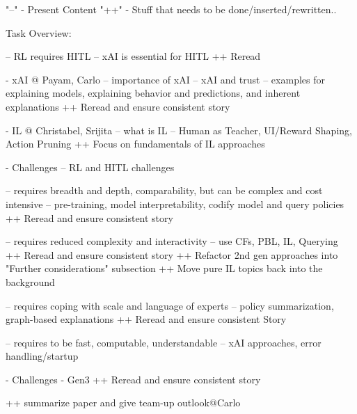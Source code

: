 "--" - Present Content
"++" - Stuff that needs to be done/inserted/rewritten..


Task Overview:

-- RL requires HITL
-- xAI is essential for HITL
++ Reread

- xAI @ Payam, Carlo
-- importance of xAI
-- xAI and trust 
-- examples for explaining models, explaining behavior and predictions, and inherent explanations
++ Reread and ensure consistent story

- IL @ Christabel, Srijita
-- what is IL
-- Human as Teacher, UI/Reward Shaping, Action Pruning
++ Focus on fundamentals of IL approaches

- Challenges
-- RL and HITL challenges


-- requires breadth and depth, comparability, but can be complex and cost intensive
-- pre-training, model interpretability, codify model and query policies
++ Reread and ensure consistent story

-- requires reduced complexity and interactivity
-- use CFs, PBL, IL, Querying
++ Reread and ensure consistent story
++ Refactor 2nd gen approaches into "Further considerations" subsection
++ Move pure IL topics back into the background

-- requires coping with scale and language of experts
-- policy summarization, graph-based explanations
++ Reread and ensure consistent Story

-- requires to be fast, computable, understandable
-- xAI approaches, error handling/startup

- Challenges
- Gen3
++ Reread and ensure consistent story

++ summarize paper and give team-up outlook@Carlo